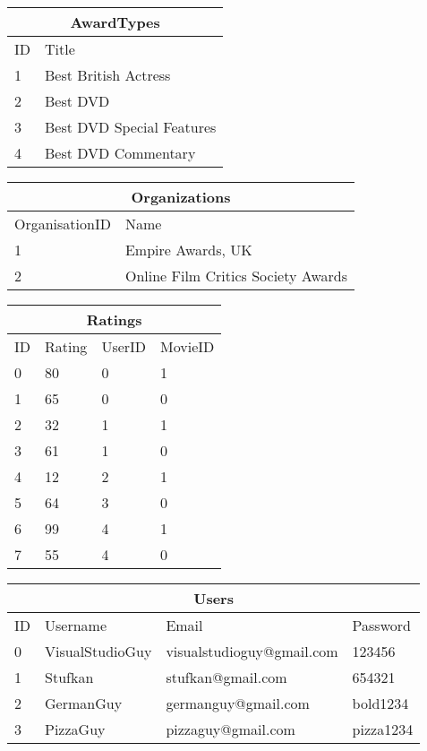 \begin{center}
\begin{tabular}{|l|l|}
\hline
\multicolumn{2}{|c|}{AwardTypes} \\ \hline
ID & Title \\ \hline \hline
1 & Best British Actress \\ \hline
2 & Best DVD \\ \hline
3 & Best DVD Special Features \\ \hline
4 & Best DVD Commentary \\ \hline
\end{tabular}
\end{center}

\begin{center}
\begin{tabular}{|l|l|}
\hline
\multicolumn{2}{|c|}{Organizations} \\ \hline
OrganisationID & Name \\ \hline \hline
1 & Empire Awards, UK \\ \hline
2 & Online Film Critics Society Awards \\ \hline
\end{tabular}
\end{center}

\begin{center}
\begin{tabular}{|l|l|l|l|}
\hline
\multicolumn{4}{|c|}{Ratings} \\ \hline
ID & Rating & UserID & MovieID \\ \hline \hline
0 & 80 & 0 & 1 \\ \hline
1 & 65 & 0 & 0 \\ \hline
2 & 32 & 1 & 1 \\ \hline
3 & 61 & 1 & 0 \\ \hline
4 & 12 & 2 & 1 \\ \hline
5 & 64 & 3 & 0 \\ \hline
6 & 99 & 4 & 1 \\ \hline
7 & 55 & 4 & 0 \\ \hline
\end{tabular}
\end{center}

\begin{center}
\begin{tabular}{|l|l|l|l|}
\hline
\multicolumn{4}{|c|}{Users} \\ \hline
ID & Username & Email & Password \\ \hline \hline
0 & VisualStudioGuy & visualstudioguy@gmail.com & 123456 \\ \hline
1 & Stufkan & stufkan@gmail.com & 654321 \\ \hline
2 & GermanGuy & germanguy@gmail.com & bold1234 \\ \hline
3 & PizzaGuy & pizzaguy@gmail.com & pizza1234 \\ \hline
\end{tabular}
\end{center}

